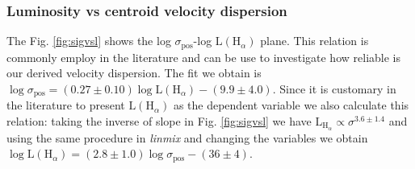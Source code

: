 \documentclass[fleqn,usenatbib, useAMS, a4paper]{mnras}
\newcommand\pos{\ensuremath{_{\mathrm{pos}}}}
\begin{document}


\subsubsection{Luminosity vs centroid velocity dispersion}\label{sec:L-vs-sigmapos}

The Fig. \ref{fig:sigvsl} shows the log \(\sigma\pos\)-log \(\text{L}(\text{H}_{\alpha})\) plane.
This relation is commonly employ in the literature  and can be use to investigate how reliable is our derived velocity dispersion.
The fit we obtain is \(\log \sigma\pos = (0.27 \pm 0.10) \log \text{L}(\text{H}_{\alpha})-(9.9 \pm 4.0)\).
Since it is customary in the literature to present \(\text{L} (\text{H}_{\alpha})\) as the dependent variable we also calculate this relation: taking the inverse of slope in Fig. \ref{fig:sigvsl} we have \(\text{L}_{\text{H}_{\alpha}} \propto \sigma^{3.6 \pm 1.4}\) and using the same procedure in \textit{linmix} and changing the variables we obtain \(\log \text{L}(\text{H}_{\alpha}) = (2.8\pm 1.0) \log \sigma\pos -(36 \pm 4)\).
\end{document}
